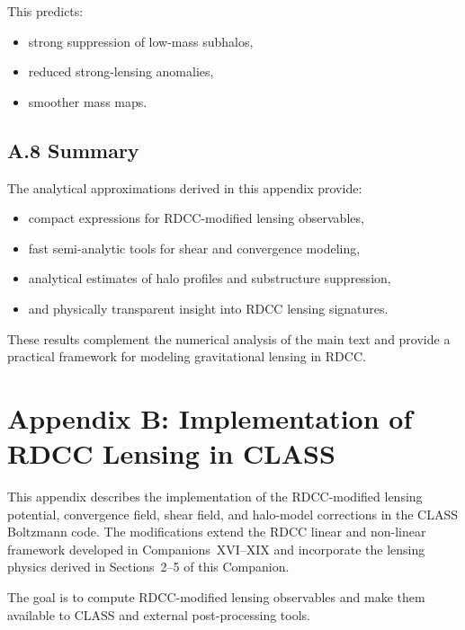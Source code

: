 \documentclass[11pt,a4paper]{article}
\begin{document}
This predicts:
\begin{itemize}
\item strong suppression of low-mass subhalos,
\item reduced strong-lensing anomalies,
\item smoother mass maps.
\end{itemize}

\subsection*{A.8 Summary}

The analytical approximations derived in this appendix provide:
\begin{itemize}
\item compact expressions for RDCC-modified lensing observables,
\item fast semi-analytic tools for shear and convergence modeling,
\item analytical estimates of halo profiles and substructure suppression,
\item and physically transparent insight into RDCC lensing signatures.
\end{itemize}

These results complement the numerical analysis of the main text and provide a practical
framework for modeling gravitational lensing in RDCC.

\section*{Appendix B: Implementation of RDCC Lensing in CLASS}

This appendix describes the implementation of the RDCC-modified lensing potential,
convergence field, shear field, and halo-model corrections in the CLASS Boltzmann code. The
modifications extend the RDCC linear and non-linear framework developed in
Companions~XVI–XIX and incorporate the lensing physics derived in Sections~2–5 of this
Companion.

The goal is to compute RDCC-modified lensing observables and make them available to
CLASS and external post-processing tools.
\end{document}
